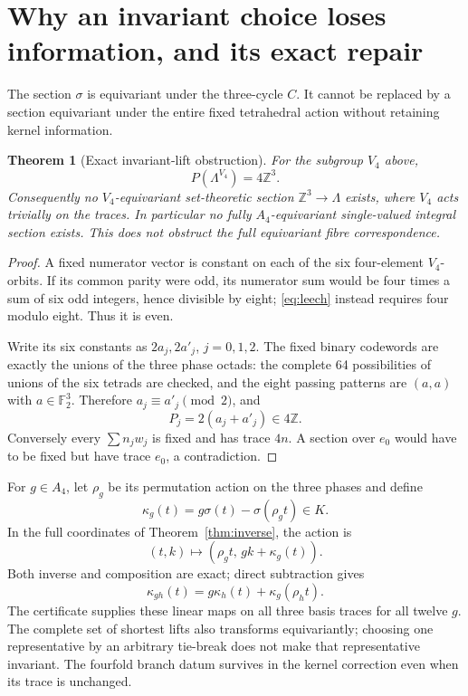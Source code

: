 \documentclass[11pt,reqno]{amsart}
\newtheorem{theorem}{Theorem}[section]
\theoremstyle{definition}\newtheorem{definition}[theorem]{Definition}
\theoremstyle{remark}\newtheorem{remark}[theorem]{Remark}
\newcommand{\Z}{\mathbb Z}\newcommand{\Q}{\mathbb Q}\newcommand{\R}{\mathbb R}\newcommand{\F}{\mathbb F}
\newcommand{\La}{\Lambda}\newcommand{\tr}{\operatorname{tr}}\newcommand{\Span}{\operatorname{span}}
\begin{document}
\section{Why an invariant choice loses information, and its exact repair}
The section $\sigma$ is equivariant under the three-cycle $C$. It cannot be replaced by a section equivariant under the entire fixed tetrahedral action without retaining kernel information.
\begin{theorem}[Exact invariant-lift obstruction]\label{thm:invariants}
For the subgroup $V_4$ above,
\[
P(\La^{V_4})=4\Z^3.
\]
Consequently no $V_4$-equivariant set-theoretic section $\Z^3\to\La$ exists, where $V_4$ acts trivially on the traces. In particular no fully $A_4$-equivariant single-valued integral section exists. This does not obstruct the full equivariant fibre correspondence.
\end{theorem}
\begin{proof}
A fixed numerator vector is constant on each of the six four-element $V_4$-orbits. If its common parity were odd, its numerator sum would be four times a sum of six odd integers, hence divisible by eight; \eqref{eq:leech} instead requires four modulo eight. Thus it is even.

Write its six constants as $2a_j,2a'_j$, $j=0,1,2$. The fixed binary codewords are exactly the unions of the three phase octads: the complete 64 possibilities of unions of the six tetrads are checked, and the eight passing patterns are $(a,a)$ with $a\in\F_2^3$. Therefore $a_j\equiv a'_j\pmod2$, and
\[
P_j=2(a_j+a'_j)\in4\Z.
\]
Conversely every $\sum n_jw_j$ is fixed and has trace $4n$. A section over $e_0$ would have to be fixed but have trace $e_0$, a contradiction.
\end{proof}
For $g\in A_4$, let $\rho_g$ be its permutation action on the three phases and define
\[
\kappa_g(t)=g\sigma(t)-\sigma(\rho_gt)\in K.
\]
In the full coordinates of Theorem~\ref{thm:inverse}, the action is
\begin{equation}\label{eq:cocycle}
(t,k)\longmapsto(\rho_gt,\,gk+\kappa_g(t)).
\end{equation}
Both inverse and composition are exact; direct subtraction gives
\[
\kappa_{gh}(t)=g\kappa_h(t)+\kappa_g(\rho_ht).
\]
The certificate supplies these linear maps on all three basis traces for all twelve $g$. The complete set of shortest lifts also transforms equivariantly; choosing one representative by an arbitrary tie-break does not make that representative invariant. The fourfold branch datum survives in the kernel correction even when its trace is unchanged.
\end{document}
